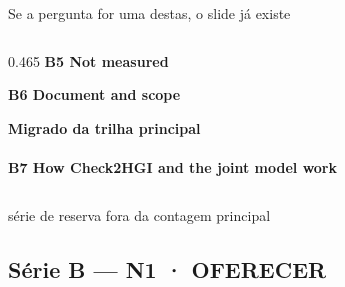 \documentclass{beamer}
\begin{document}
\begin{frame}[noframenumbering]{Se a pergunta for uma destas, o slide já existe}
\begin{columns}[T,onlytextwidth]
\begin{column}{0.465\textwidth}
        \textbf{B5 \textbullet{} Not measured}\\
        \hyperlink{q5}{}\hyperlink{q8}{}\hyperlink{u1}{}\hyperlink{u2}{}\hyperlink{u3}{}\hyperlink{u4}{}\hyperlink{u5}{}\hyperlink{u6}{}\hyperlink{u7}{}\hyperlink{u8}{}
        \smallskip

        \textbf{B6 \textbullet{} Document and scope}\\
        \hyperlink{b61}{}\hyperlink{b62}{}\hyperlink{b63}{}\hyperlink{b64}{}\hyperlink{b65}{}\hyperlink{b66}{}\hyperlink{b66b}{}
        \smallskip

        \textbf{Migrado da trilha principal}\\
        \hyperlink{bgeo}{}\\[2mm]
        \textbf{B7 \textbullet{} How Check2HGI and the joint model work}\\
        \hyperlink{barch}{}\hyperlink{b71}{}\hyperlink{b72}{}\hyperlink{b73}{}\hyperlink{b74}{}\hyperlink{b75}{}\hyperlink{b76}{}
    \end{column}
    \end{columns}

    \vfill
    {\scriptsize\textcolor{black!70}{série de reserva \textbullet{} fora da contagem principal}}
\end{frame}


\subsection{Série B --- N1 · OFERECER}
\end{document}
